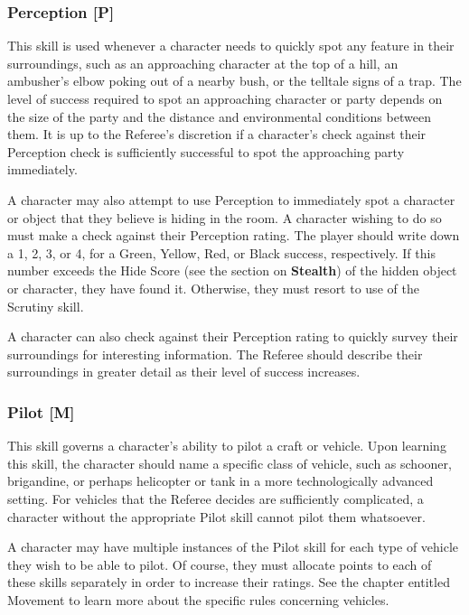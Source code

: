 \documentclass[oneside]{book}
\begin{document}
\begin{multicols}{2}
\subsubsection{Perception [P]}
This skill is used whenever a character needs to quickly spot any feature in their surroundings, such as an approaching character at the top of a hill, an ambusher's elbow poking out of a nearby bush, or the telltale signs of a trap. The level of success required to spot an approaching character or party depends on the size of the party and the distance and environmental conditions between them. It is up to the Referee's discretion if a character's check against their Perception check is sufficiently successful to spot the approaching party immediately. 

A character may also attempt to use Perception to immediately spot a character or object that they believe is hiding in the room. A character wishing to do so must make a check against their Perception rating. The player should write down a 1, 2, 3, or 4, for a Green, Yellow, Red, or Black success, respectively. If this number exceeds the Hide Score (see the section on \textbf{Stealth}) of the hidden object or character, they have found it. Otherwise, they must resort to use of the Scrutiny skill.

A character can also check against their Perception rating to quickly survey their surroundings for interesting information. The Referee should describe their surroundings in greater detail as their level of success increases. 


\subsubsection{Pilot [M]}
This skill governs a character's ability to pilot a craft or vehicle. Upon learning this skill, the character should name a specific class of vehicle, such as schooner, brigandine, or perhaps helicopter or tank in a more technologically advanced setting. For vehicles that the Referee decides are sufficiently complicated, a character without the appropriate Pilot skill cannot pilot them whatsoever.

A character may have multiple instances of the Pilot skill for each type of vehicle they wish to be able to pilot. Of course, they must allocate points to each of these skills separately in order to increase their ratings.
See the chapter entitled Movement to learn more about the specific rules concerning vehicles. 


\end{multicols}
\end{document}
